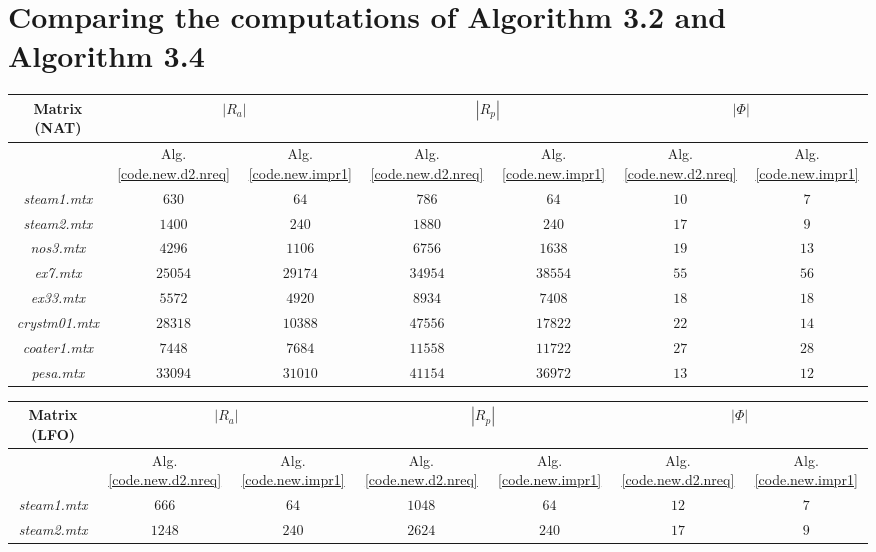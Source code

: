 \documentclass[12pt, twoside,a4paper,toc=bibliography]{scrbook}
\begin{document}
\section{Comparing the computations of Algorithm 3.2 and Algorithm 3.4}
\label{app.compare.alg32.alg34}
\begin{table}
\centering
\begin{tabular}{|c|c|c|c|c|c|c|}
\hline
Matrix (NAT) & \multicolumn{2}{c|}{$|R_a|$} & \multicolumn{2}{c|}{$|R_p|$} & \multicolumn{2}{c|}{$|\Phi|$}\\\hline
{} & Alg.\ref{code.new.d2.nreq}& Alg.\ref{code.new.impr1} & Alg.\ref{code.new.d2.nreq} & Alg.\ref{code.new.impr1}& Alg.\ref{code.new.d2.nreq} & Alg.\ref{code.new.impr1}\\\hline
\textit{steam1.mtx} & $630$ & $64$ & $786$ & $64$ & $10$ & $7$\\\hline
\textit{steam2.mtx} & $1400$ & $240$ & $1880$ & $240$ & $17$ & $9$\\\hline
\textit{nos3.mtx} & $4296$ & $1106$ & $6756$ & $1638$ & $19$ & $13$\\\hline
\textit{ex7.mtx} & $25054$ & $29174$ & $34954$ & $38554$ & $55$ & $56$\\\hline
\textit{ex33.mtx} & $5572$ & $4920$ & $8934$ & $7408$ & $18$ & $18$\\\hline
\textit{crystm01.mtx} & $28318$ & $10388$ & $47556$ & $17822$ & $22$ & $14$\\\hline
\textit{coater1.mtx} & $7448$ & $7684$ & $11558$ & $11722$ & $27$ & $28$\\\hline
\textit{pesa.mtx} & $33094$ & $31010$ & $41154$ & $36972$ & $13$ & $12$\\\hline
\end{tabular}
\vspace*{1cm}\newline
\begin{tabular}{|c|c|c|c|c|c|c|}
\hline
Matrix (LFO) & \multicolumn{2}{c|}{$|R_a|$} & \multicolumn{2}{c|}{$|R_p|$} & \multicolumn{2}{c|}{$|\Phi|$}\\\hline
{} & Alg.\ref{code.new.d2.nreq}& Alg.\ref{code.new.impr1} & Alg.\ref{code.new.d2.nreq} & Alg.\ref{code.new.impr1}& Alg.\ref{code.new.d2.nreq} & Alg.\ref{code.new.impr1}\\\hline
\textit{steam1.mtx} & $666$ & $64$ & $1048$ & $64$ & $12$ & $7$\\\hline
\textit{steam2.mtx} & $1248$ & $240$ & $2624$ & $240$ & $17$ & $9$\\\hline

\end{tabular}
\end{table}
\end{document}

